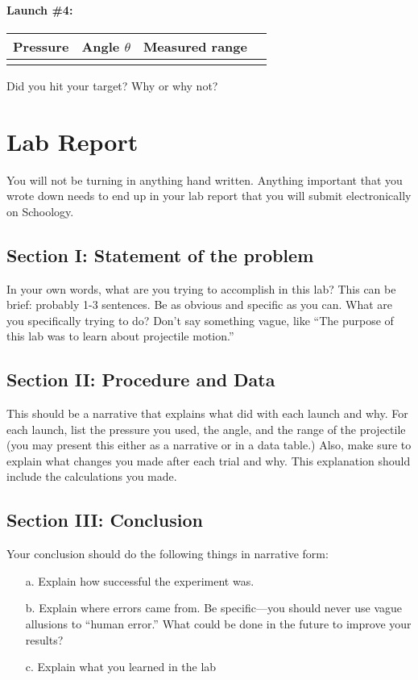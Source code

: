 \documentclass[10pt]{exam}
\begin{document}
\datatable
\vs


\paragraph{Launch \#4:}\hfill

\begin{tabular}{|c|c|c|c|}
  \hline
  Pressure & Angle $\theta$ & Measured range \\\hline
           &                &                \\[1em]
  \hline
\end{tabular}

\vspace{0.5em}

{\small Did you hit your target?  Why or why not?}

\pagebreak


\section*{Lab Report} You will not be turning in anything hand written.  Anything important that you wrote down needs to end up in your lab report that you will submit electronically on Schoology.

\subsection*{Section I: Statement of the problem}
In your own words, what are you trying to accomplish in this lab?  This can be brief: probably 1-3 sentences.  Be as obvious and specific as you can.  What are you specifically trying to do?  Don't say something vague, like ``The purpose of this lab was to learn about projectile motion.''

\subsection*{Section II: Procedure and Data}
This should be a narrative that explains what did with each launch and why.  For each launch, list the pressure you used, the angle, and the range of the projectile (you may present this either as a narrative or in a data table.)  Also, make sure to explain what changes you made after each trial and why.  This explanation should include the calculations you made.

\subsection*{Section III: Conclusion}
Your conclusion should do the following things in narrative form:
\begin{itemize}
  \item[a.] Explain how successful the experiment was.
  \item[b.] Explain where errors came from. Be specific—you should never use vague allusions to “human error.”  What could be done in the future to improve your results?
  \item[c.] Explain what you learned in the lab
\end{itemize}
\end{document}
